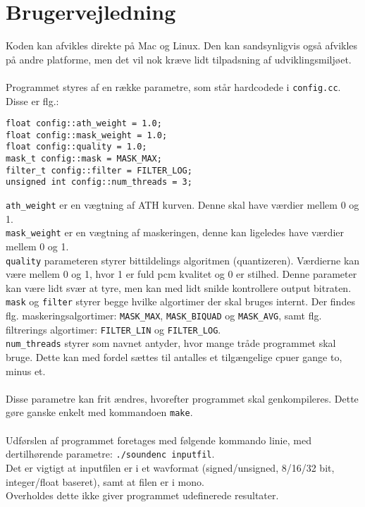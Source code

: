\section{Brugervejledning}
Koden kan afvikles direkte på Mac og Linux. Den kan sandsynligvis også
afvikles på andre platforme, men det vil nok kræve lidt tilpadsning af
udviklingsmiljøet.\\
\\
Programmet styres af en række parametre, som står hardcodede i
\texttt{config.cc}. Disse er flg.:
\begin{verbatim}
float config::ath_weight = 1.0;
float config::mask_weight = 1.0;
float config::quality = 1.0;
mask_t config::mask = MASK_MAX;
filter_t config::filter = FILTER_LOG;
unsigned int config::num_threads = 3;
\end{verbatim}
\texttt{ath\_weight} er en vægtning af ATH kurven. Denne skal have
værdier mellem 0 og 1.\\
\texttt{mask\_weight} er en vægtning af maskeringen, denne kan ligeledes
have værdier mellem 0 og 1.\\
\texttt{quality} parameteren styrer bittildelings algoritmen
(quantizeren). Værdierne kan være mellem 0 og 1, hvor 1 er fuld pcm
kvalitet og 0 er stilhed. Denne parameter kan være lidt svær at tyre,
men kan med lidt snilde kontrollere output bitraten.\\
\texttt{mask} og \texttt{filter} styrer begge hvilke algortimer der skal
bruges internt. Der findes flg. maskeringsalgortimer: \texttt{MASK\_MAX},
\texttt{MASK\_BIQUAD} og \texttt{MASK\_AVG}, samt flg. filtrerings
algortimer: \texttt{FILTER\_LIN} og \texttt{FILTER\_LOG}.\\
\texttt{num\_threads} styrer som navnet antyder, hvor mange tråde
programmet skal bruge. Dette kan med fordel sættes til antalles et
tilgængelige cpuer gange to, minus et.\\
\\
Disse parametre kan frit ændres, hvorefter programmet skal
genkompileres. Dette gøre ganske enkelt med kommandoen \texttt{make}.\\
\\
Udførslen af programmet foretages med følgende kommando linie, med
dertilhørende parametre: \texttt{./soundenc inputfil}.\\
Det er vigtigt at inputfilen er i et wavformat (signed/unsigned,
8/16/32 bit, integer/float baseret), samt at filen er i mono.\\
Overholdes dette ikke giver programmet udefinerede resultater.\\
